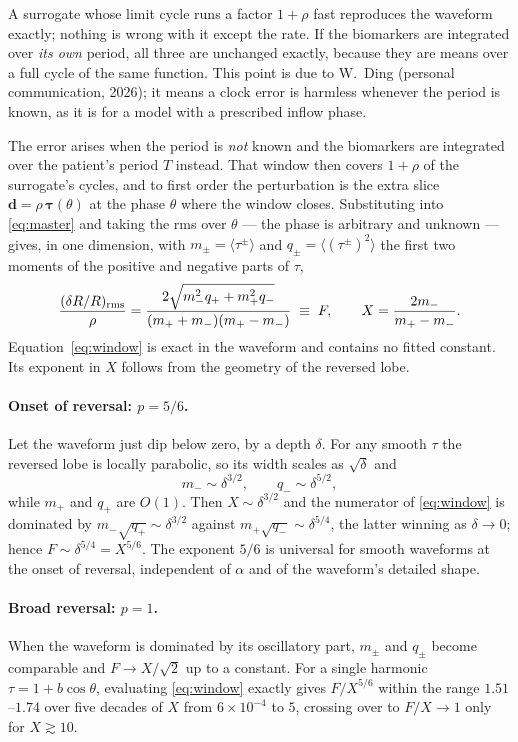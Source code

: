 \documentclass[11pt,a4paper]{article}
\begin{document}
A surrogate whose limit cycle runs a factor $1+\rho$ fast reproduces the
waveform exactly; nothing is wrong with it except the rate. If the biomarkers
are integrated over \emph{its own} period, all three are unchanged exactly,
because they are means over a full cycle of the same function. This point is
due to W.\ Ding (personal communication, 2026); it means a clock error is
harmless whenever the period is known, as it is for a model with a
prescribed inflow phase.

The error arises when the period is \emph{not} known and the biomarkers are
integrated over the patient's period $T$ instead. That window then covers
$1+\rho$ of the surrogate's cycles, and to first order the perturbation is
the extra slice $\mathbf d=\rho\,\boldsymbol\tau(\theta)$ at the phase
$\theta$ where the window closes. Substituting into \eqref{eq:master} and
taking the rms over $\theta$ --- the phase is arbitrary and unknown --- gives,
in one dimension, with $m_\pm=\langle\tau^\pm\rangle$ and
$q_\pm=\langle(\tau^\pm)^2\rangle$ the first two moments of the positive and
negative parts of $\tau$,
\begin{equation}
\frac{(\delta R/R)_{\rm rms}}{\rho}
=\frac{2\sqrt{m_-^2q_++m_+^2q_-}}{(m_++m_-)(m_+-m_-)}\;\equiv\;F,
\qquad
X=\frac{2m_-}{m_+-m_-}.
\label{eq:window}
\end{equation}
Equation~\eqref{eq:window} is exact in the waveform and contains no fitted
constant. Its exponent in $X$ follows from the geometry of the reversed lobe.

\paragraph{Onset of reversal: $p=5/6$.}
Let the waveform just dip below zero, by a depth $\delta$. For any smooth
$\tau$ the reversed lobe is locally parabolic, so its width scales as
$\sqrt\delta$ and
\begin{equation}
m_-\sim\delta^{3/2},\qquad q_-\sim\delta^{5/2},
\end{equation}
while $m_+$ and $q_+$ are $O(1)$. Then $X\sim\delta^{3/2}$ and the numerator
of \eqref{eq:window} is dominated by $m_-\sqrt{q_+}\sim\delta^{3/2}$ against
$m_+\sqrt{q_-}\sim\delta^{5/4}$, the latter winning as $\delta\to0$; hence
$F\sim\delta^{5/4}=X^{5/6}$. The exponent $5/6$ is universal for smooth
waveforms at the onset of reversal, independent of $\alpha$ and of the
waveform's detailed shape.

\paragraph{Broad reversal: $p=1$.}
When the waveform is dominated by its oscillatory part,
$m_\pm$ and $q_\pm$ become comparable and $F\to X/\sqrt2$ up to a constant.
For a single harmonic $\tau=1+b\cos\theta$, evaluating \eqref{eq:window}
exactly gives $F/X^{5/6}$ within the range $1.51$--$1.74$ over five decades
of $X$ from $6\times10^{-4}$ to $5$, crossing over to $F/X\to1$ only for
$X\gtrsim10$.
\end{document}
